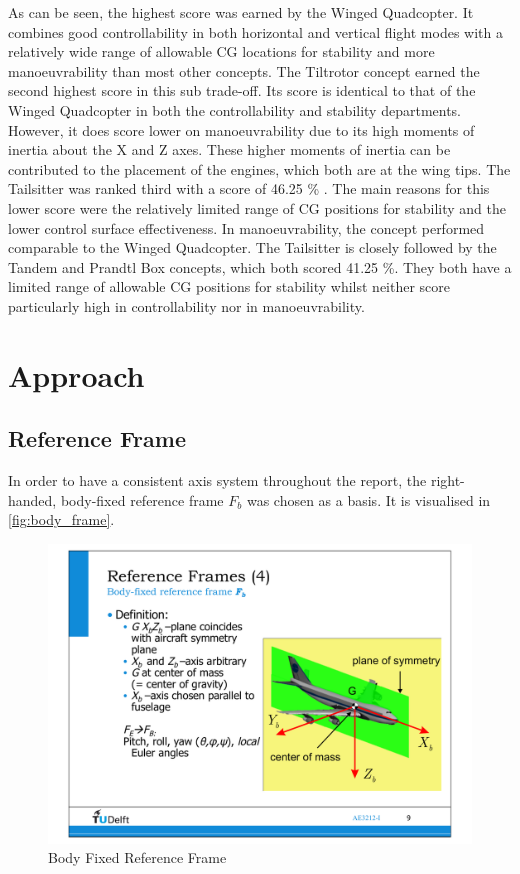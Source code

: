 As can be seen, the highest score was earned by the Winged Quadcopter. It combines good controllability in both horizontal and vertical flight modes with a relatively wide range of allowable CG locations for stability and more manoeuvrability than most other concepts. The Tiltrotor concept earned the second highest score in this sub trade-off. Its score is identical to that of the Winged Quadcopter in both the controllability and stability departments. However, it does score lower on manoeuvrability due to its high moments of inertia about the X and Z axes. These higher moments of inertia can be contributed to the placement of the engines, which both are at the wing tips. The Tailsitter was ranked third with a score of 46.25 \% . The main reasons for this lower score were the relatively limited range of CG positions for stability and the lower control surface effectiveness. In manoeuvrability, the concept performed comparable to the Winged Quadcopter. The Tailsitter is closely followed by the Tandem and Prandtl Box concepts, which both scored 41.25 \%. They both have a limited range of allowable CG positions for stability whilst neither score particularly high in controllability nor in manoeuvrability.

\section{Approach}
\label{sec:app}


\subsection{Reference Frame}

In order to have a consistent axis system throughout the report, the right-handed, body-fixed reference frame $F_b$ was chosen as a basis. It is visualised in \autoref{fig:body_frame}. 

\begin{figure}[htb]
    \centering
    \includegraphics[width=.35\textwidth]{Stability/Figures/body_frame.pdf}
    \caption{Body Fixed Reference Frame \cite{fd_lec08}}
    \label{fig:body_frame}
\end{figure}



